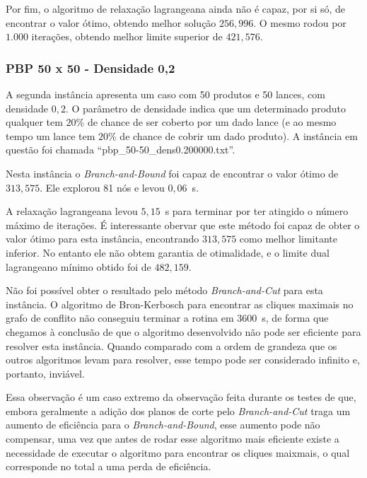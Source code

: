 \documentclass{article}
\begin{document}
    Por fim, o algoritmo de relaxação lagrangeana ainda não é capaz, por si só, de encontrar o valor ótimo, obtendo melhor solução $256{,}996$. O mesmo rodou por $1.000$ iterações, obtendo melhor limite superior de $421{,}576$.


    
    \subsubsection{PBP 50 x 50 - Densidade 0,2}
    
    
    A segunda instância apresenta um caso com 50 produtos e 50 lances, com densidade $0{,}2$. O parâmetro de densidade indica que um determinado produto qualquer tem $20\%$ de chance de ser coberto por um dado lance (e ao mesmo tempo um lance tem $20\%$ de chance de cobrir um dado produto). A instância em questão foi chamada \enquote{pbp\_50-50\_dens0.200000.txt}.
    
    Nesta instância o \emph{Branch-and-Bound} foi capaz de encontrar o valor ótimo de $313{,}575$. Ele explorou 81 nós e levou $0{,}06$~s. 
    
    A relaxação lagrangeana levou $5{,}15$~s para terminar por ter atingido o número máximo de iterações. É interessante obervar que este método foi capaz de obter o valor ótimo para esta instância, encontrando $313{,}575$ como melhor limitante inferior. No entanto ele não obtem garantia de otimalidade, e o limite dual lagrangeano mínimo obtido foi de $482{,}159$.
    
    Não foi possível 
    obter o resultado pelo método \emph{Branch-and-Cut} para esta instância. O algoritmo de Bron-Kerbosch para encontrar as cliques maximais no grafo de conflito não conseguiu terminar a rotina em $3600$~s, de forma que chegamos à conclusão de que o algoritmo desenvolvido não pode ser eficiente para resolver esta instância. Quando comparado com a ordem de grandeza que os outros algoritmos levam para resolver, esse tempo pode ser considerado infinito e, portanto, inviável.
    
    Essa observação é um caso extremo da observação feita durante os testes de que, embora geralmente a adição dos planos de corte pelo \emph{Branch-and-Cut} traga um aumento de eficiência para o \emph{Branch-and-Bound}, esse aumento pode não compensar, uma vez que antes de rodar esse algoritmo mais eficiente existe a necessidade de executar o algoritmo para encontrar os cliques maixmais, o qual corresponde no total a uma perda de eficiência.
    
\end{document}
